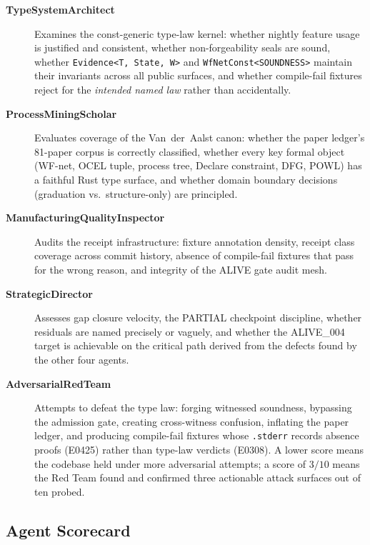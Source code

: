 \begin{description}
  \item[\textbf{TypeSystemArchitect}]
    Examines the const-generic type-law kernel: whether nightly feature usage
    is justified and consistent, whether non-forgeability seals are sound,
    whether \texttt{Evidence<T, State, W>} and \texttt{WfNetConst<SOUNDNESS>}
    maintain their invariants across all public surfaces, and whether
    compile-fail fixtures reject for the \emph{intended named law} rather than
    accidentally.

  \item[\textbf{ProcessMiningScholar}]
    Evaluates coverage of the Van~der~Aalst canon: whether the paper ledger's
    81-paper corpus is correctly classified, whether every key formal object
    (WF-net, OCEL tuple, process tree, Declare constraint, DFG, POWL) has a
    faithful Rust type surface, and whether domain boundary decisions
    (graduation vs.\ structure-only) are principled.

  \item[\textbf{ManufacturingQualityInspector}]
    Audits the receipt infrastructure: fixture annotation density, receipt
    class coverage across commit history, absence of compile-fail fixtures that
    pass for the wrong reason, and integrity of the ALIVE gate audit mesh.

  \item[\textbf{StrategicDirector}]
    Assesses gap closure velocity, the PARTIAL checkpoint discipline, whether
    residuals are named precisely or vaguely, and whether the ALIVE\_004 target
    is achievable on the critical path derived from the defects found by the
    other four agents.

  \item[\textbf{AdversarialRedTeam}]
    Attempts to defeat the type law: forging witnessed soundness, bypassing the
    admission gate, creating cross-witness confusion, inflating the paper
    ledger, and producing compile-fail fixtures whose \texttt{.stderr} records
    absence proofs (E0425) rather than type-law verdicts (E0308).
    A lower score means the codebase held under more adversarial attempts; a
    score of $3/10$ means the Red Team found and confirmed three actionable
    attack surfaces out of ten probed.
\end{description}

\subsection{Agent Scorecard}

